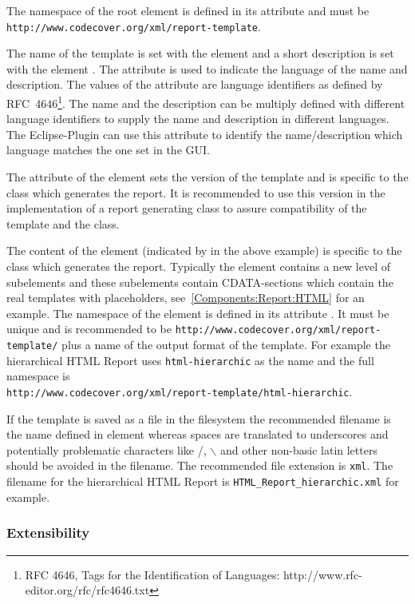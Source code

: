 The namespace of the root element is defined in its attribute  and must be \texttt{http://www.codecover.org/xml/report-template}.

The name of the template is set with the element  and a short description is set with the element . The attribute  is used to indicate the language of the name and description. The values of the attribute are language identifiers as defined by RFC~4646\footnote{RFC 4646, Tags for the Identification of Languages: http://www.rfc-editor.org/rfc/rfc4646.txt}. The name and the description can be multiply defined with different language identifiers to supply the name and description in different languages. The Eclipse-Plugin can use this attribute to identify the name/description which language matches the one set in the GUI.

The attribute  of the element  sets the version of the template and is specific to the class which generates the report. It is recommended to use this version in the implementation of a report generating class to assure compatibility of the template and the class.

The content of the element  (indicated by  in the above example) is specific to the class which generates the report. Typically the element  contains a new level of subelements and these subelements contain CDATA-sections which contain the real templates with placeholders, see~\ref{Components:Report:HTML} for an example. The namespace of the element  is defined in its attribute . It must be unique and is recommended to be \texttt{http://www.codecover.org/xml/report-template/} plus a name of the output format of the template. For example the hierarchical HTML Report uses \texttt{html-hierarchic} as the name and the full namespace is \\
\texttt{http://www.codecover.org/xml/report-template/html-hierarchic}.

If the template is saved as a file in the filesystem the recommended filename is the name defined in element  whereas spaces are translated to underscores and potentially problematic characters like /, $\backslash$ and other non-basic latin letters should be avoided in the filename. The recommended file extension is \texttt{xml}. The filename for the hierarchical HTML Report is \texttt{HTML\_Report\_hierarchic.xml} for example.

\subsubsection{Extensibility}

